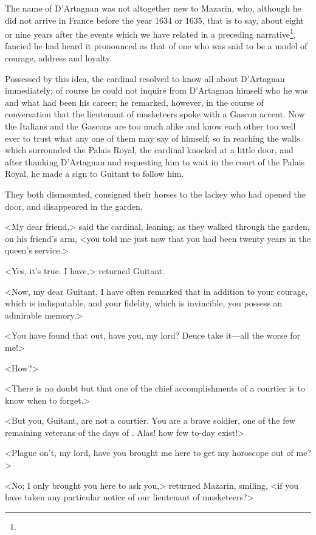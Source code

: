 The name of D'Artagnan was not altogether new to Mazarin, who, although he did not arrive in France before the year 1634 or 1635, that is to say, about eight or nine years after the events which we have related in a preceding narrative\footnote{}, fancied he had heard it pronounced as that of one who was said to be a model of courage, address and loyalty. 

Possessed by this idea, the cardinal resolved to know all about D'Artagnan immediately; of course he could not inquire from D'Artagnan himself who he was and what had been his career; he remarked, however, in the course of conversation that the lieutenant of musketeers spoke with a Gascon accent. Now the Italians and the Gascons are too much alike and know each other too well ever to trust what any one of them may say of himself; so in reaching the walls which surrounded the Palais Royal, the cardinal knocked at a little door, and after thanking D'Artagnan and requesting him to wait in the court of the Palais Royal, he made a sign to Guitant to follow him.

They both dismounted, consigned their horses to the lackey who had opened the door, and disappeared in the garden.

<My dear friend,> said the cardinal, leaning, as they walked through the garden, on his friend's arm, <you told me just now that you had been twenty years in the queen's service.>

<Yes, it's true. I have,> returned Guitant.

<Now, my dear Guitant, I have often remarked that in addition to your courage, which is indisputable, and your fidelity, which is invincible, you possess an admirable memory.>

<You have found that out, have you, my lord? Deuce take it—all the worse for me!>

<How?>

<There is no doubt but that one of the chief accomplishments of a courtier is to know when to forget.>

<But you, Guitant, are not a courtier. You are a brave soldier, one of the few remaining veterans of the days of . Alas! how few to-day exist!>

<Plague on't, my lord, have you brought me here to get my horoscope out of me?>

<No; I only brought you here to ask you,> returned Mazarin, smiling, <if you have taken any particular notice of our lieutenant of musketeers?>

